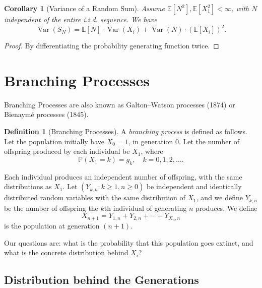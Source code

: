 \documentclass[11pt]{article}
\numberwithin{equation}{section}
\newtheorem{corollary}[theorem]{Corollary}
\theoremstyle{definition}
\newtheorem{definition}[theorem]{Definition}
\theoremstyle{remark}
\newcommand{\pqty}[1]{\left(#1\right)}
\newcommand{\bqty}[1]{\left[#1\right]}
\newcommand{\Prob}{\mathbb P}
\newcommand{\Expt}{\mathbb E}
\DeclareMathOperator{\Var}{Var}
\begin{document}
\begin{corollary}[Variance of a Random Sum]\label{probability-corollary-009}
    \label{probability-cor:var-random-sum}%
Assume \(\Expt[N^2],\Expt[X_1^2]<\infty\), with \(N\) independent of the entire i.i.d. sequence.
    We have
    \[
        \Var\pqty{S_N} = \Expt\bqty{N} \cdot \Var\pqty{X_i} + \Var\pqty{N} \cdot \pqty{\Expt\bqty{X_i}}^2.
    \]
\end{corollary}

\begin{proof}\label{probability-proof-046}
    By differentiating the probability generating function twice.
\end{proof}

\section{Branching Processes}\label{probability-section-10}

Branching Processes are also known as Galton--Watson processes (1874) or Bienaym\'{e} processes (1845).

\begin{definition}[Branching Processes]\label{probability-definition-041}
    \label{probability-def:branching-process}%
    A \emph{branching process} is defined as follows. Let the population initially have \(X_0 = 1\), in generation \(0\). Let the number of offspring produced by each individual be \(X_1\), where
    \[
        \Prob\pqty{X_1 = k} = g_k, \quad k = 0, 1, 2, \ldots.
    \]

    Each individual produces an independent number of offspring, with the same distributions as \(X_1\). Let \(\pqty{Y_{k, n} : k \geq 1, n \geq 0}\) be independent and identically distributed random variables with the same distribution of \(X_1\), and we define \(Y_{k, n}\) be the number of offspring the \(k\)th individual of generating \(n\) produces. We define
    \[
        X_{n + 1} = Y_{1, n} + Y_{2, n} + \cdots + Y_{X_n, n}
    \]
    is the population at generation \(\pqty{n + 1}\).
\end{definition}

Our questions are: what is the probability that this population goes extinct, and what is the concrete distribution behind \(X_i\)?

\subsection{Distribution behind the Generations}
\end{document}
